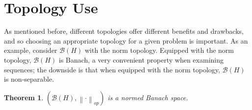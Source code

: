 \documentclass{article}
\theoremstyle{plain}
\newtheorem{theorem}{Theorem}
\theoremstyle{definition}
\newcommand{\norm}[1]{\left\lVert #1 \right\rVert}
\newcommand{\BH}{\cal{B}(H)}
\renewcommand{\cal}[1]{\mathcal{#1}}
\begin{document}
\section{Topology Use} \label{sec:topology use}

        As mentioned before, different topologies offer different benefits and drawbacks, and so choosing an appropriate topology for a given problem is important.
        As an example, consider $\BH$ with the norm topology.
        Equipped with the norm topology, $\BH$ is Banach, a very convenient property when examining sequences; the downside is that when equipped with the norm topology, $\BH$ is non-separable.
        \begin{theorem}
                $(\BH, \norm{\cdot}_{op})$ is a normed Banach space.
        \end{theorem}
\end{document}
